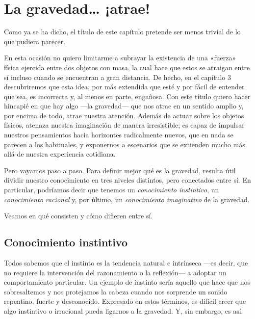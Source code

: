 
\chapter{La gravedad… ¡atrae!}\label{ch:01}

Como ya se ha dicho, el título de este capítulo pretende ser menos trivial de lo que
pudiera parecer.

En esta ocasión no quiero limitarme a subrayar la existencia de una «fuerza» física
ejercida entre dos objetos con masa, la cual hace que estos se atraigan entre sí incluso
cuando se encuentran a gran distancia. De hecho, en el capítulo 3 descubriremos que
esta idea, por más extendida que esté y por fácil de entender que sea, es incorrecta y,
al menos en parte, engañosa. Con este título quiero hacer hincapié en que hay algo
---la gravedad--- que nos atrae en un sentido amplio y, por encima de todo, atrae
nuestra atención. Además de actuar sobre los objetos físicos, atenaza nuestra
imaginación de manera irresistible; es capaz de impulsar nuestros pensamientos hacia
horizontes radicalmente nuevos, que en nada se parecen a los habituales, y exponernos
a escenarios que se extienden mucho más allá de nuestra experiencia cotidiana.

Pero vayamos paso a paso. Para definir mejor qué es la gravedad, resulta útil dividir
nuestro conocimiento en tres niveles distintos, pero conectados entre sí. En particular,
podríamos decir que tenemos un \emph{conocimiento instintivo},
un \emph{conocimiento racional} y, por último, un
\emph{conocimiento imaginativo} de la gravedad.

Veamos en qué consisten y cómo difieren entre sí.

\section{Conocimiento instintivo}\label{sec:01-instinctive}

Todos sabemos que el instinto es la tendencia natural e intrínseca ---es decir, que no
requiere la intervención del razonamiento o la reflexión--- a adoptar un comportamiento
particular. Un ejemplo de instinto sería aquello que hace que nos sobresaltemos y nos
protejamos la cabeza cuando nos sorprende un sonido repentino, fuerte y desconocido.
Expresado en estos términos, es difícil creer que algo instintivo o irracional pueda
ligarnos a la gravedad. Y, sin embargo, es así.

